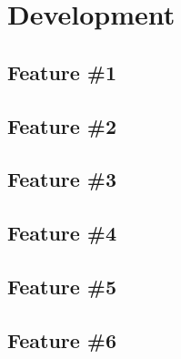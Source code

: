 \chapter{Development}

\section{Feature \#1}

\section{Feature \#2}

\section{Feature \#3}

\section{Feature \#4}

\section{Feature \#5}

\section{Feature \#6}